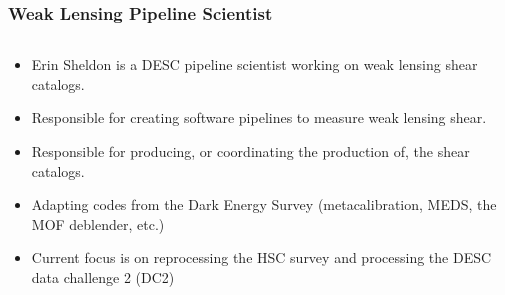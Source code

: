\documentclass[aspectratio=169]{beamer}
\begin{document}
\frame
{

    \frametitle{Weak Lensing Pipeline Scientist}

    \begin{columns}
        \begin{column}{0.7\textwidth}


            \begin{itemize}

                \item Erin Sheldon is a DESC 
                    pipeline scientist working on weak lensing
                    shear catalogs.

                \item Responsible for creating software 
                    pipelines to measure weak lensing shear.

                \item Responsible for producing, or coordinating
                    the production of, the shear catalogs.

                \item Adapting codes from the Dark
                    Energy Survey (metacalibration, MEDS,
                    the MOF deblender, etc.)

                \item Current focus is on reprocessing the HSC survey
                    and processing the DESC data challenge 2 (DC2)

            \end{itemize}


        \end{column}


\end{columns}}
\end{document}

